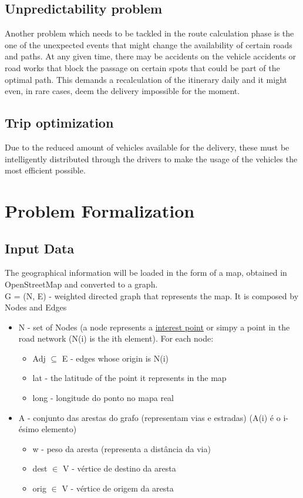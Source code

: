 \documentclass[12pt]{article}
\begin{document}
\subsection{Unpredictability problem}
Another problem which needs to be tackled in the route calculation phase is the one of the unexpected events that might change the availability of certain roads and paths. At any given time, there may be accidents on the vehicle accidents or road works that block the passage on certain spots that could be part of the optimal path. This demands a recalculation of the itinerary daily and it might even, in rare cases, deem the delivery impossible for the moment.

\subsection{Trip optimization}
Due to the reduced amount of vehicles available for the delivery, these must be intelligently distributed through the drivers to make the usage of the vehicles the most efficient possible.

\newpage

\section{Problem Formalization}

\subsection{Input Data}
The geographical information will be loaded in the form of a map, obtained in OpenStreetMap and converted to a graph. \\

G = (N, E) - weighted directed graph that represents the map. It is composed by Nodes and Edges
\begin{itemize}

	\item N - set of Nodes (a node represents a \uline{interest point} or simpy a point in the road network (N(i) is the ith element). For each node:
\begin{itemize}
	\item Adj $ \subseteq $  E - edges whose origin is N(i)
	\item lat - the latitude of the point it represents in the map
	\item long - longitude do ponto no mapa real
\end{itemize}

	\item A - conjunto das arestas do grafo (representam vias e estradas) (A(i) é o i-ésimo elemento)
\begin{itemize}
	\item w - peso da aresta (representa a distância da via)
	\item dest $ \in $  V - vértice de destino da aresta
	\item orig $ \in $  V - vértice de origem da aresta
\end{itemize}

\end{itemize}
\end{document}
